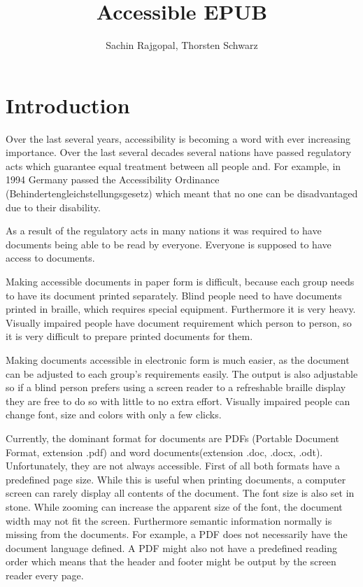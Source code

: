\documentclass{article}
\title{Accessible EPUB}
\author{Sachin Rajgopal, Thorsten Schwarz}
\date{}
\begin{document}
\maketitle

\section{Introduction}
Over the last several years, accessibility is becoming a word with ever increasing importance. Over the last several decades several nations have passed regulatory acts which guarantee equal treatment between all people and. For example, in 1994 Germany passed the Accessibility Ordinance (Behindertengleichstellungsgesetz) which meant that no one can be disadvantaged due to their disability.

As a result of the regulatory acts in many nations it was required to have documents being able to be read by everyone. Everyone is supposed to have access to documents.

Making accessible documents in paper form is difficult, because each group needs to have its document printed separately. Blind people need to have documents printed in braille, which requires special equipment. Furthermore it is very heavy. Visually impaired people have document requirement which person to person, so it is very difficult to prepare printed documents for them.

Making documents accessible in electronic form is much easier, as the document can be adjusted to each group's requirements easily. The output is also adjustable so if a blind person prefers using a screen reader to a refreshable braille display they are free to do so with little to no extra effort. Visually impaired people can change font, size and colors with only a few clicks.

Currently, the dominant format for documents are PDFs (Portable Document Format, extension .pdf) and word documents(extension .doc, .docx, .odt). Unfortunately, they are not always accessible. First of all both formats have a predefined page size. While this is useful when printing documents, a computer screen can rarely display all contents of the document. The font size is also set in stone. While zooming can increase the apparent size of the font, the document width may not fit the screen. Furthermore semantic information normally is missing from the documents. For example, a PDF does not necessarily have the document language defined. A PDF might also not have a predefined reading order which means that the header and footer might be output by the screen reader every page. 
\end{document}
